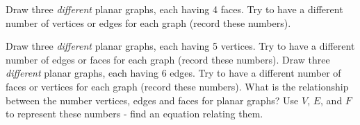 \documentclass[11pt]{exam}
\begin{document}
\begin{questions}
\vfill
\vfill

\question Draw three {\em different} planar graphs, each having 4 faces.  Try to have a different number of vertices or edges for each graph (record these numbers).
\vfill
\vfill
\vfill

\newpage
\question Draw three {\em different} planar graphs, each having 5 vertices.  Try to have a different number of edges or faces for each graph (record these numbers).
\vfill
\vfill
\question Draw three {\em different} planar graphs, each having 6 edges. Try to have a different number of faces or vertices for each graph (record these numbers).
\vfill
\vfill
\question What is the relationship between the number vertices, edges and faces for planar graphs?  Use $V$, $E$, and $F$ to represent these numbers - find an equation relating them.
\vfill
\end{questions}
\end{document}
